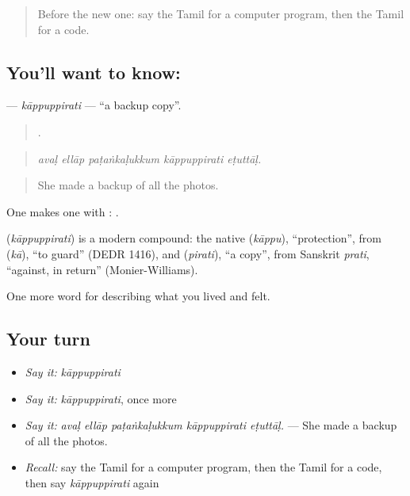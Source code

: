 \label{lesson:TA-C518-kappuppirati}



\begin{quote}
Before the new one: say the Tamil for a computer program, then the Tamil for a code.
\end{quote}

\subsection*{You'll want to know: }
\textbf{} — \emph{kāppuppirati} — \textquotedblleft{}a backup copy\textquotedblright{}.

\begin{quote}
    .
\end{quote}

\begin{quote}
\emph{avaḷ ellāp paṭaṅkaḷukkum kāppuppirati eṭuttāḷ.}
\end{quote}

\begin{quote}
She made a backup of all the photos.
\end{quote}

One makes one with :  .

\begin{cousinweb}
\textbf{} (\emph{kāppuppirati}) is a modern compound: the native  (\emph{kāppu}), \textquotedblleft{}protection\textquotedblright{}, from  (\emph{kā}), \textquotedblleft{}to guard\textquotedblright{} (DEDR 1416), and  (\emph{pirati}), \textquotedblleft{}a copy\textquotedblright{}, from Sanskrit \emph{prati}, \textquotedblleft{}against, in return\textquotedblright{} (Monier-Williams).
\end{cousinweb}

\begin{grammarlens}[title={What you've built}]
One more word for describing what you lived and felt.
\end{grammarlens}

\subsection*{Your turn}
\begin{itemize}
\raggedright
  \item \emph{Say it:} \emph{kāppuppirati}
  \item \emph{Say it:} \emph{kāppuppirati}, once more
  \item \emph{Say it:} \emph{avaḷ ellāp paṭaṅkaḷukkum kāppuppirati eṭuttāḷ.} — She made a backup of all the photos.
  \item \emph{Recall:} say the Tamil for a computer program, then the Tamil for a code, then say \emph{kāppuppirati} again
\end{itemize}

